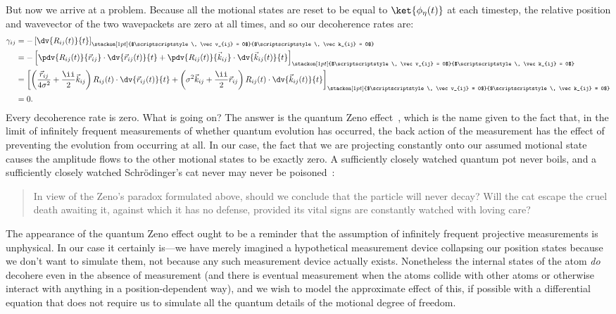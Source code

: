 But now we arrive at a problem. Because all the motional states are reset to be equal to $\ket{\phi_\eta(t)}$ at each timestep, the relative position and wavevector of the two wavepackets are zero at all times, and so our decoherence rates are:
\begin{align}
\gamma_{ij} &= -\left[\dv{R_{ij}(t)}{t}\right]_{
\stackon[1pt]
{$\scriptscriptstyle\, \vec v_{ij} = 0$}
{$\scriptscriptstyle\, \vec k_{ij} = 0$}
}\\
&= -\left[
\pdv{R_{ij}(t)}{\vec r_{ij}}\cdot \dv{\vec r_{ij}(t)}{t} + 
\pdv{R_{ij}(t)}{\vec k_{ij}}\cdot \dv{\vec k_{ij}(t)}{t}\right]_{
\stackon[1pt]
{$\scriptscriptstyle\, \vec v_{ij} = 0$}
{$\scriptscriptstyle\, \vec k_{ij} = 0$}
}\\
&= \left[
\left(
\frac{\vec r_{ij}}{4\sigma^2} + \frac\ii2\vec k_{ij}
\right)R_{ij}(t)\cdot\dv{\vec r_{ij}(t)}{t}
+ \left(
\sigma^2\vec k_{ij} + \frac\ii2\vec r_{ij}
\right)R_{ij}(t)\cdot\dv{\vec k_{ij}(t)}{t}
\right]_{
\stackon[1pt]
{$\scriptscriptstyle\, \vec v_{ij} = 0$}
{$\scriptscriptstyle\, \vec k_{ij} = 0$}
}\\
&= 0.
\end{align}
Every decoherence rate is zero. What is going on? The answer is the quantum Zeno effect~\cite{PhysRevA.41.2295, doi:10.1063/1.523304}, which is the name given to the fact that, in the limit of infinitely frequent measurements of whether quantum evolution has occurred, the back action of the measurement has the effect of preventing the evolution from occurring at all. In our case, the fact that we are projecting constantly onto our assumed motional state causes the amplitude flows to the other motional states to be exactly zero. A sufficiently closely watched quantum pot never boils, and a sufficiently closely watched Schr\"odinger's cat never may never be poisoned~\cite{doi:10.1063/1.523304}:
\begin{quote}
In view of
the Zeno's paradox formulated above, should we conclude
that the particle will never decay? Will the cat
escape the cruel death awaiting it, against which it has
no defense, provided its vital signs are constantly
watched with loving care? 
\end{quote}
The appearance of the quantum Zeno effect ought to be a reminder that the assumption of infinitely frequent projective measurements is unphysical. In our case it certainly is---we have merely imagined a hypothetical measurement device collapsing our position states because we don't want to simulate them, not because any such measurement device actually exists. Nonetheless the internal states of the atom \emph{do} decohere even in the absence of measurement (and there is eventual measurement when the atoms collide with other atoms or otherwise interact with anything in a position-dependent way), and we wish to model the approximate effect of this, if possible with a differential equation that does not require us to simulate all the quantum details of the motional degree of freedom.

